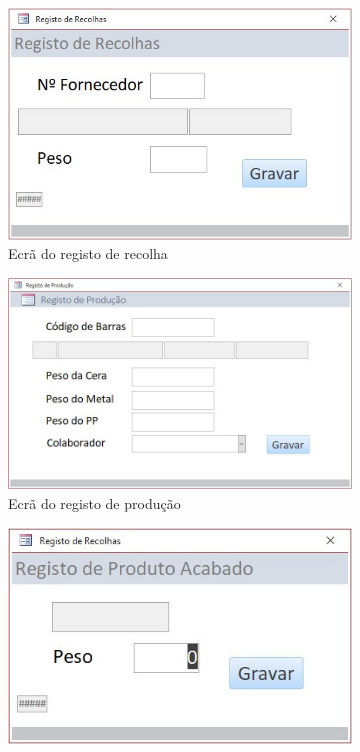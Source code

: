 \begin{figure}[h!]
	\begin{subfigure}[c]{0.3\linewidth}
		\includegraphics[width=\linewidth]{figuras/AppAccess/2-Recolha.jpg}
		\caption{Ecrã do registo de recolha}
	\end{subfigure}
	\begin{subfigure}[c]{0.3\linewidth}
		\includegraphics[width=\linewidth]{figuras/AppAccess/3-Producao.jpg}
		\caption{Ecrã do registo de produção}
	\end{subfigure}
	\begin{subfigure}[c]{0.3\linewidth}
		\includegraphics[width=\linewidth]{figuras/AppAccess/4-ProdutoAcabado.jpg}

\end{subfigure}
\end{figure}

